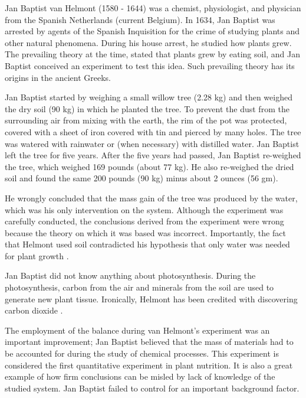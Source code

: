 \documentclass[
]{book}
\begin{document}
Jan Baptist van Helmont (1580 - 1644) was a chemist, physiologist, and physician from the Spanish Netherlands (current Belgium).
In 1634, Jan Baptist was arrested by agents of the Spanish Inquisition for the crime of studying plants and other natural phenomena. During his house arrest, he studied how plants grew. The prevailing theory at the time, stated that plants grew by eating soil, and Jan Baptist conceived an experiment to test this idea. Such prevailing theory has its origins in the ancient Greeks.

Jan Baptist started by weighing a small willow tree (2.28 kg) and then weighed the dry soil (90 kg) in which he planted the tree. To prevent the dust from the surrounding air from mixing with the earth, the rim of the pot was protected, covered with a sheet of iron covered with tin and pierced by many holes. The tree was watered with rainwater or (when necessary) with distilled water. Jan Baptist left the tree for five years. After the five years had passed, Jan Baptist re-weighed the tree, which weighed 169 pounds (about 77 kg). He also re-weighed the dried soil and found the same 200 pounds (90 kg) minus about 2 ounces (56 gm).

He wrongly concluded that the mass gain of the tree was produced by the water, which was his only intervention on the system. Although the experiment was carefully conducted, the conclusions derived from the experiment were wrong because the theory on which it was based was incorrect. Importantly, the fact that Helmont used soil contradicted his hypothesis that only water was needed for plant growth \citep{hershey1991digging}.

Jan Baptist did not know anything about photosynthesis. During the photosynthesis, carbon from the air and minerals from the soil are used to generate new plant tissue. Ironically, Helmont has been credited with discovering carbon dioxide \citep{hershey1991digging}.

The employment of the balance during van Helmont's experiment was an important improvement; Jan Baptist believed that the mass of materials had to be accounted for during the study of chemical processes. This experiment is considered the first quantitative experiment in plant nutrition. It is also a great example of how firm conclusions can be misled by lack of knowledge of the studied system. Jan Baptist failed to control for an important background factor.
\end{document}

